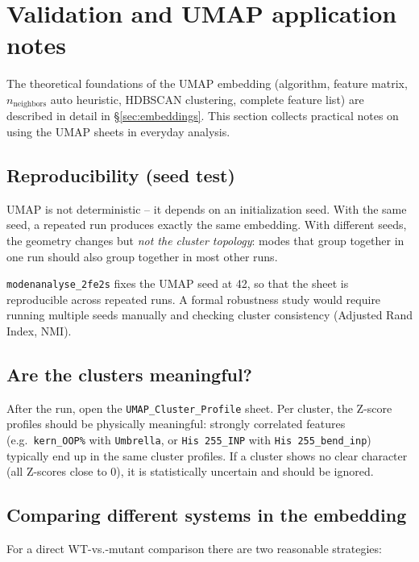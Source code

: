 \documentclass[11pt,a4paper,twoside]{article}
\theoremstyle{remark}
\begin{document}
\section{Validation and UMAP application notes}

The theoretical foundations of the UMAP embedding (algorithm,
feature matrix, $n_\text{neighbors}$ auto heuristic, HDBSCAN
clustering, complete feature list) are described in detail in
\S\ref{sec:embeddings}. This section collects practical notes on
using the UMAP sheets in everyday analysis.

\subsection{Reproducibility (seed test)}

UMAP is not deterministic -- it depends on an initialization seed.
With the same seed, a repeated run produces exactly the same
embedding. With different seeds, the geometry changes but
\emph{not the cluster topology}: modes that group together in one
run should also group together in most other runs.

\texttt{modenanalyse\_2fe2s} fixes the UMAP seed at 42, so that the
sheet is reproducible across repeated runs. A formal robustness
study would require running multiple seeds manually and checking
cluster consistency (Adjusted Rand Index, NMI).

\subsection{Are the clusters meaningful?}

After the run, open the \texttt{UMAP\_Cluster\_Profile} sheet. Per
cluster, the Z-score profiles should be physically meaningful:
strongly correlated features (e.g.\ \texttt{kern\_OOP\%} with
\texttt{Umbrella}, or \texttt{His 255\_INP} with
\texttt{His 255\_bend\_inp}) typically end up in the same cluster
profiles. If a cluster shows no clear character (all Z-scores close
to 0), it is statistically uncertain and should be ignored.

\subsection{Comparing different systems in the embedding}

For a direct WT-vs.-mutant comparison there are two reasonable
strategies:
\end{document}
